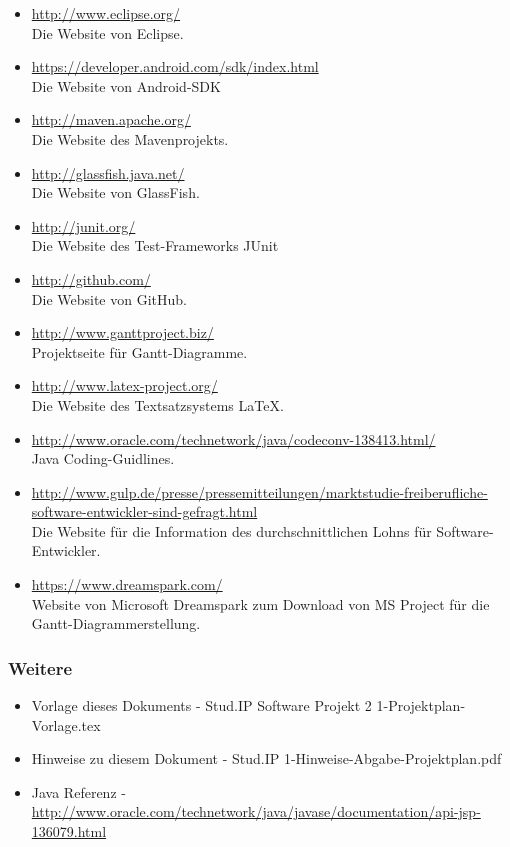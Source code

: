 \documentclass[fontsize=12pt,paper=a4,twoside]{scrartcl}
\begin{document}
\begin{itemize}
\item{\url{http://www.eclipse.org/}\\ Die Website von Eclipse.} \item{\url{https://developer.android.com/sdk/index.html}\\ Die Website von Android-SDK}
\item{\url{http://maven.apache.org/}\\ Die Website des Mavenprojekts.}
\item{\url{http://glassfish.java.net/}\\ Die Website von GlassFish.}
\item{\url{http://junit.org/}\\ Die Website des Test-Frameworks JUnit}
\item{\url{http://github.com/}\\ Die Website von GitHub.}
\item{\url{http://www.ganttproject.biz/}\\ Projektseite für Gantt-Diagramme.}
\item{\url{http://www.latex-project.org/}\\ Die Website des Textsatzsystems \LaTeX.}
\item{\url{http://www.oracle.com/technetwork/java/codeconv-138413.html/}\\ Java Coding-Guidlines.}
\item{\url{http://www.gulp.de/presse/pressemitteilungen/marktstudie-freiberufliche-software-entwickler-sind-gefragt.html}\\ Die Website für die Information des durchschnittlichen Lohns für Software-Entwickler.}
\item{\url{https://www.dreamspark.com/}\\Website von Microsoft Dreamspark zum Download von MS Project für die Gantt-Diagrammerstellung.}
\end{itemize}

\subsubsection{Weitere}
\begin{itemize}
\item{Vorlage dieses Dokuments - Stud.IP Software Projekt 2 1-Projektplan-Vorlage.tex}
\item{Hinweise zu diesem Dokument - Stud.IP 1-Hinweise-Abgabe-Projektplan.pdf}
\item{Java Referenz - \url{http://www.oracle.com/technetwork/java/javase/documentation/api-jsp-136079.html}}
\end{itemize}
\end{document}

